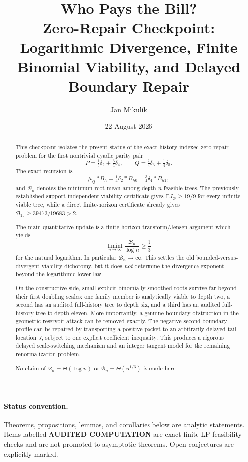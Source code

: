 \documentclass[11pt,a4paper]{article}
\title{\textbf{Who Pays the Bill?}\\[1mm]
\large Zero-Repair Checkpoint:\\
Logarithmic Divergence, Finite Binomial Viability, and Delayed Boundary Repair}
\author{Jan Mikul\'ik}
\date{22 August 2026}
\newcommand{\E}{\mathbb E}
\newcommand{\cB}{\mathcal B}
\newcommand{\1}{\mathbf 1}
\begin{document}
\maketitle

\begin{abstract}
This checkpoint isolates the present status of the exact history-indexed
zero-repair problem for the first nontrivial dyadic parity pair
\[
P=\tfrac14\delta_2+\tfrac34\delta_4,
\qquad
Q=\tfrac34\delta_3+\tfrac14\delta_5.
\]
The exact recursion is
\[
\mu_Q*B_h
=
\tfrac14\delta_2*B_{h0}
+
\tfrac34\delta_4*B_{h1},
\]
and \(\cB_n\) denotes the minimum root mean among depth-\(n\) feasible trees.
The previously established support-independent viability certificate gives
\(\E J_\varnothing\ge19/9\) for every infinite viable tree, while a direct
finite-horizon certificate already gives
\(\cB_{15}\ge39473/19683>2\).

The main quantitative update is a finite-horizon transform/Jensen argument
which yields
\[
\boxed{
\liminf_{n\to\infty}\frac{\cB_n}{\log n}\ge\frac13
}
\]
for the natural logarithm.  In particular \(\cB_n\to\infty\).
This settles the old bounded-versus-divergent viability dichotomy, but it does
\emph{not} determine the divergence exponent beyond the logarithmic lower law.

On the constructive side, small explicit binomially smoothed roots survive far
beyond their first doubling scales: one family member is analytically viable to
depth two, a second has an audited full-history tree to depth six, and a third
has an audited full-history tree to depth eleven.  More importantly, a genuine
boundary obstruction in the geometric-reservoir attack can be removed exactly.
The negative second boundary profile can be repaired by transporting a positive
packet to an arbitrarily delayed tail location \(J\), subject to one explicit
coefficient inequality.  This produces a rigorous delayed scale-switching
mechanism and an integer tangent model for the remaining renormalization
problem.

No claim of \(\cB_n=\Theta(\log n)\) or
\(\cB_n=\Theta(n^{1/3})\) is made here.
\end{abstract}

\paragraph{Status convention.}
Theorems, propositions, lemmas, and corollaries below are analytic statements.
Items labelled \textbf{AUDITED COMPUTATION} are exact finite LP feasibility
checks and are not promoted to asymptotic theorems.  Open conjectures are
explicitly marked.
\end{document}
